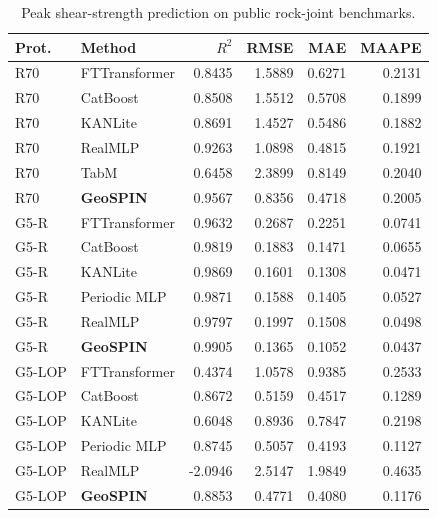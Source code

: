 \begin{table}
\caption{Peak shear-strength prediction on public rock-joint benchmarks.}
\label{tab:benchmark_results}
\begin{tabular}{llrrrr}
\toprule
Prot. & Method & $R^2$ & RMSE & MAE & MAAPE \\
\midrule
R70 & FTTransformer & 0.8435 & 1.5889 & 0.6271 & 0.2131 \\
R70 & CatBoost & 0.8508 & 1.5512 & 0.5708 & 0.1899 \\
R70 & KANLite & 0.8691 & 1.4527 & 0.5486 & 0.1882 \\
R70 & RealMLP & 0.9263 & 1.0898 & 0.4815 & 0.1921 \\
R70 & TabM & 0.6458 & 2.3899 & 0.8149 & 0.2040 \\
R70 & \textbf{GeoSPIN} & 0.9567 & 0.8356 & 0.4718 & 0.2005 \\
G5-R & FTTransformer & 0.9632 & 0.2687 & 0.2251 & 0.0741 \\
G5-R & CatBoost & 0.9819 & 0.1883 & 0.1471 & 0.0655 \\
G5-R & KANLite & 0.9869 & 0.1601 & 0.1308 & 0.0471 \\
G5-R & Periodic MLP & 0.9871 & 0.1588 & 0.1405 & 0.0527 \\
G5-R & RealMLP & 0.9797 & 0.1997 & 0.1508 & 0.0498 \\
G5-R & \textbf{GeoSPIN} & 0.9905 & 0.1365 & 0.1052 & 0.0437 \\
G5-LOP & FTTransformer & 0.4374 & 1.0578 & 0.9385 & 0.2533 \\
G5-LOP & CatBoost & 0.8672 & 0.5159 & 0.4517 & 0.1289 \\
G5-LOP & KANLite & 0.6048 & 0.8936 & 0.7847 & 0.2198 \\
G5-LOP & Periodic MLP & 0.8745 & 0.5057 & 0.4193 & 0.1127 \\
G5-LOP & RealMLP & -2.0946 & 2.5147 & 1.9849 & 0.4635 \\
G5-LOP & \textbf{GeoSPIN} & 0.8853 & 0.4771 & 0.4080 & 0.1176 \\
\bottomrule
\end{tabular}
\end{table}
